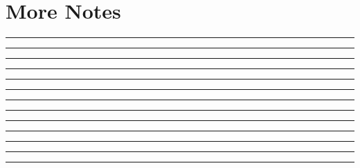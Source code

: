 \documentclass[11pt,a4paper,twoside,titlepage]{scrartcl}
\begin{document}
\clearpage
\section{More Notes}
\vspace{1cm}
\noindent\rule{\textwidth}{0.2pt}
\vspace{1cm}
\noindent\rule{\textwidth}{0.2pt}
\vspace{1cm}
\noindent\rule{\textwidth}{0.2pt}
\vspace{1cm}
\noindent\rule{\textwidth}{0.2pt}
\vspace{1cm}
\noindent\rule{\textwidth}{0.2pt}
\vspace{1cm}
\noindent\rule{\textwidth}{0.2pt}
\vspace{1cm}
\noindent\rule{\textwidth}{0.2pt}
\vspace{1cm}
\noindent\rule{\textwidth}{0.2pt}
\vspace{1cm}
\noindent\rule{\textwidth}{0.2pt}
\vspace{1cm}
\noindent\rule{\textwidth}{0.2pt}
\vspace{1cm}
\noindent\rule{\textwidth}{0.2pt}
\vspace{1cm}
\noindent\rule{\textwidth}{0.2pt}
\vspace{1cm}
\noindent\rule{\textwidth}{0.2pt}
\vspace{1cm}
\end{document}
